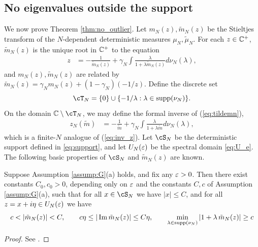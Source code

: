 \subsection{No eigenvalues outside the support}\label{sec:nooutliers}

We now prove Theorem \ref{thm:no_outlier}.
Let $m_N(z),\tilde m_N(z)$ be the Stieltjes
transform of the $N$-dependent deterministic measures $\mu_N,\tilde \mu_N$.
For each $z \in \mathbb{C}^+$, $\tilde m_N(z)$ is the unique root in $\mathbb{C}^+$ to the equation
\begin{align}
z&=-\frac{1}{\tilde m_N(z)}+\gamma_N \int \frac{\lambda}{1+\lambda \tilde
m_N(z)} d\nu_N(\lambda),\label{eq:tildemn}
\end{align}
and $m_N(z),\tilde m_N(z)$ are related by
$\tilde m_N(z)=\gamma_N m_N(z)+(1-\gamma_N)({-}1/z)$.
Define the discrete set
\begin{equation}\label{eq:zNdomain}
\cT_N=\{0\} \cup \{-1/\lambda:\lambda \in \supp{\nu_N}\}.
\end{equation}
On the domain $\C \setminus \cT_N$,
we may define the formal inverse of (\ref{eq:tildemn}),
\begin{align}
z_N(\tilde m)&=-\frac{1}{\tilde m}+\gamma_N \int \frac{\lambda}{1+\lambda \tilde
m} d\nu_N(\lambda),\label{eq:z_N_def}
\end{align}
which is a finite-$N$ analogue of (\ref{eq:inv_z}).
Let $\cS_N$ be the deterministic support defined in \eqref{eq:support}, and let
$U_N(\varepsilon)$ be the spectral domain \eqref{eq:U_e}. The following basic
properties of $\cS_N$ and $\tilde m_N(z)$ are known.

\begin{proposition}\label{prop:basic_mn}
Suppose Assumption \ref{assump:G}(a) holds, and fix any $\varepsilon>0$. Then there
exist constants $C_0,c_0>0$, depending only on $\varepsilon$ and the constants $C,c$ of
Assumption \ref{assump:G}(a), such that for all $x \in \cS_N$ we have $|x| \leq C$,
and for all $z=x+i\eta \in U_N(\varepsilon)$ we have
\[c<|\tilde m_N(z)|<C, \qquad c\eta \leq |\Im \tilde m_N(z)| \leq C\eta,
\qquad \min_{\lambda \in \supp{\nu_N}}
|1+\lambda\,\tilde m_N(z)| \geq c\]
\end{proposition}
\begin{proof}
See \cite[Propositions A.3, B.1, B.2]{fan2022tracy}.
\end{proof}

